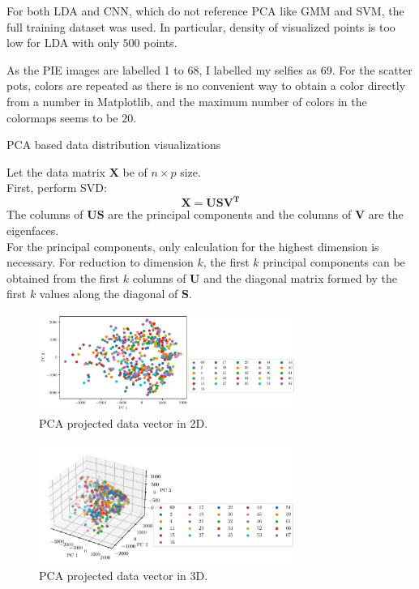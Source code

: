 \documentclass[a4paper]{exam}
\begin{document}
For both LDA and CNN, which do not reference PCA like GMM and SVM, the full training dataset was used.
In particular, density of visualized points is too low for LDA with only $500$ points.

As the PIE images are labelled 1 to 68, I labelled my selfies as 69.
For the scatter pots, colors are repeated as there is no convenient way to obtain a color directly from a number in Matplotlib,
and the maximum number of colors in the colormaps seems to be $20$.

\begin{questions}
    \question PCA based data distribution visualizations

    Let the data matrix $\mathbf{X}$ be of $n \times p$ size.\\
    First, perform SVD:
    \begin{equation}
        \mathbf{X}=\mathbf{USV^T}
    \end{equation}
    The columns of $\mathbf{US}$ are the principal components and the columns of $\mathbf{V}$ are the eigenfaces.\\
    For the principal components, only calculation for the highest dimension is necessary. For reduction to
    dimension $k$, the first $k$ principal components can be obtained from the first $k$ columns of
    $\mathbf{U}$ and the diagonal matrix formed by the first $k$ values along the diagonal of $\mathbf{S}$.

    \begin{figure}[h]
        \centering
        \includegraphics[width=0.75\textwidth]{pca_2d}
        \caption{PCA projected data vector in 2D.}
        \label{fig:pca_2d}
    \end{figure}

    \begin{figure}[ht]
        \centering
        \includegraphics[width=0.75\textwidth]{pca_3d}
        \caption{PCA projected data vector in 3D.}
        \label{fig:pca_3d}
    \end{figure}


\end{questions}
\end{document}
